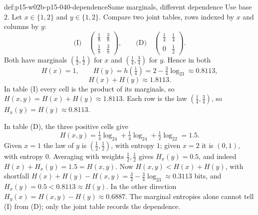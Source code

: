 \begin{hbexample}{def:p15-w02b-p15-040-dependence}{Same marginals, different dependence}
Use base \(2\). Let \(x\in\{1,2\}\) and \(y\in\{1,2\}\). Compare two
joint tables, rows indexed by \(x\) and columns by \(y\):
\[
 \text{(I)}\quad
 \begin{pmatrix}\tfrac18&\tfrac38\\[2pt]\tfrac18&\tfrac38\end{pmatrix},
 \qquad
 \text{(D)}\quad
 \begin{pmatrix}\tfrac14&\tfrac14\\[2pt]0&\tfrac12\end{pmatrix}.
\]
Both have marginals \((\tfrac12,\tfrac12)\) for \(x\) and
\((\tfrac14,\tfrac34)\) for \(y\). Hence in both
\[
 H(x)=1,\qquad H(y)=h(\tfrac14)=2-\tfrac34\log_23\approx0.8113,
\]
\[
 H(x)+H(y)\approx1.8113 .
\]
In table (I) every cell is the product of its marginals, so
\(H(x,y)=H(x)+H(y)\approx1.8113\). Each row is the law
\((\tfrac14,\tfrac34)\), so \(H_x(y)=H(y)\approx0.8113\).

In table (D), the three positive cells give
\[
 H(x,y)=\tfrac14\log_24+\tfrac14\log_24+\tfrac12\log_22=1.5 .
\]
Given \(x=1\) the law of \(y\) is \((\tfrac12,\tfrac12)\), with
entropy \(1\); given \(x=2\) it is \((0,1)\), with entropy \(0\).
Averaging with weights \(\tfrac12,\tfrac12\) gives \(H_x(y)=0.5\), and
indeed \(H(x)+H_x(y)=1.5=H(x,y)\). Now \(H(x,y)<H(x)+H(y)\), with shortfall
\(H(x)+H(y)-H(x,y)=\tfrac32-\tfrac34\log_23\approx0.3113\) bits, and
\(H_x(y)=0.5<0.8113\approx H(y)\).
In the other direction \(H_y(x)=H(x,y)-H(y)\approx0.6887\).
The marginal entropies alone cannot tell (I) from (D); only the joint
table records the dependence.
\end{hbexample}

